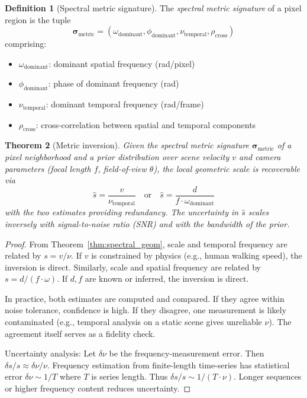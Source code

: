 \documentclass[11pt,twocolumn,a4paper]{article}
\newtheorem{theorem}{Theorem}[section]
\theoremstyle{definition}
\newtheorem{definition}[theorem]{Definition}
\begin{document}
\begin{definition}[Spectral metric signature]
\label{def:spec_metric}
The \emph{spectral metric signature} of a pixel region is the tuple
\begin{equation}
\bm{\sigma}_{\text{metric}} = (\omega_{\text{dominant}}, \phi_{\text{dominant}}, \nu_{\text{temporal}}, \rho_{\text{cross}})
\end{equation}
comprising:
\begin{itemize}[leftmargin=1.4em]
  \item $\omega_{\text{dominant}}$: dominant spatial frequency (rad/pixel)
  \item $\phi_{\text{dominant}}$: phase of dominant frequency (rad)
  \item $\nu_{\text{temporal}}$: dominant temporal frequency (rad/frame)
  \item $\rho_{\text{cross}}$: cross-correlation between spatial and temporal components
\end{itemize}
\end{definition}

\begin{theorem}[Metric inversion]
\label{thm:metric_inversion}
Given the spectral metric signature $\bm{\sigma}_{\text{metric}}$ of a pixel neighborhood and a prior distribution over scene velocity $v$ and camera parameters (focal length $f$, field-of-view $\theta$), the local geometric scale is recoverable via
\begin{equation}
\hat{s} = \frac{v}{\nu_{\text{temporal}}} \quad \text{or} \quad \hat{s} = \frac{d}{f \cdot \omega_{\text{dominant}}}
\end{equation}
with the two estimates providing redundancy. The uncertainty in $\hat{s}$ scales inversely with signal-to-noise ratio (SNR) and with the bandwidth of the prior.
\end{theorem}

\begin{proof}
From Theorem~\ref{thm:spectral_geom}, scale and temporal frequency are related by $s = v / \nu$. If $v$ is constrained by physics (e.g., human walking speed), the inversion is direct. Similarly, scale and spatial frequency are related by $s = d / (f \cdot \omega)$. If $d, f$ are known or inferred, the inversion is direct.

In practice, both estimates are computed and compared. If they agree within noise tolerance, confidence is high. If they disagree, one measurement is likely contaminated (e.g., temporal analysis on a static scene gives unreliable $\nu$). The agreement itself serves as a fidelity check.

Uncertainty analysis: Let $\delta \nu$ be the frequency-measurement error. Then $\delta s / s \approx \delta \nu / \nu$. Frequency estimation from finite-length time-series has statistical error $\delta \nu \sim 1/T$ where $T$ is series length. Thus $\delta s / s \sim 1/(T \cdot \nu)$. Longer sequences or higher frequency content reduces uncertainty.
\end{proof}
\end{document}
